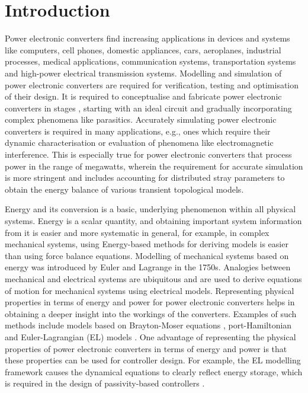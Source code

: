 \documentclass[preprint,12pt]{elsarticle}
\begin{document}
\section{Introduction}
Power electronic converters find increasing applications in devices and systems like computers, cell phones, domestic appliances, cars, aeroplanes, industrial processes, medical applications, communication systems, transportation systems and high-power electrical transmission systems. Modelling and simulation of power electronic converters are required for verification, testing and optimisation of their design. It is required to conceptualise and fabricate power electronic converters in stages \citep{mohan}, starting with an ideal circuit and gradually incorporating complex phenomena like parasitics. Accurately
simulating power electronic converters is required in many applications, e.g., ones which require their dynamic characterisation or evaluation of phenomena like electromagnetic interference. This is especially true for power electronic converters that process power in the range of megawatts, wherein the requirement for accurate simulation is more stringent and includes accounting for distributed stray parameters to obtain the energy balance of various transient topological models\cite{tan}.

Energy and its conversion is a basic, underlying phenomenon within all physical systems. Energy is a scalar quantity, and obtaining important system information from it is easier and more systematic in general, for example, in complex mechanical systems, using Energy-based methods for deriving models is easier than using force balance equations. Modelling of mechanical systems based on energy was introduced by Euler and Lagrange in the 1750s. Analogies between mechanical and electrical systems are ubiquitous \cite{bloch} and are used to derive equations of motion for mechanical systems using electrical models. Representing physical properties in terms of energy and power for power electronic converters helps in obtaining a deeper insight into the workings of the converters. Examples of such methods include models based on Brayton-Moser equations \citep{pbm}, port-Hamiltonian \citep{ortega_automatica}
and Euler-Lagrangian (EL) models \cite{Cuk,scherpen_2003, scherpen_2019, umetani2016, russer2012}. One advantage of representing the physical properties of power electronic converters in terms of energy and power is that these properties can be used for controller design. For example, the EL modelling framework causes the dynamical equations to clearly reflect energy storage, which is required in the design of passivity-based controllers \citep{ortega_book}.
\end{document}
